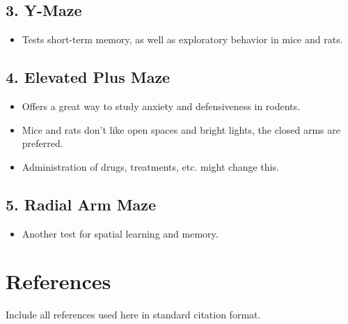 \documentclass[12pt,a4paper]{article}
\begin{document}
	\subsection{3. Y-Maze}
	
	\begin{itemize}
		\item Tests short-term memory, as well as exploratory behavior in mice and rats. 
	\end{itemize}
	
	\subsection{4. Elevated Plus Maze}
	
	\begin{itemize}
		\item Offers a great way to study anxiety and defensiveness in rodents. 
		\item Mice and rats don't like open spaces and bright lights, the closed arms are preferred. 
		\item Administration of drugs, treatments, etc. might change this. 
	\end{itemize}
	
	\subsection{5. Radial Arm Maze}
	
	\begin{itemize}
		\item Another test for spatial learning and memory. 
	\end{itemize}
	
	\section{References}
	Include all references used here in standard citation format.
	
\end{document}
